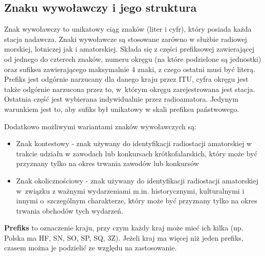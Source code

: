 \documentclass[]{mgr}
\begin{document}
            \subsection{Znaku wywoławczy i jego struktura}
            Znak wywoławczy to unikatowy ciąg znaków (liter i cyfr), który posiada każda stacja nadawcza. Znaki wywoławcze są stosowane zarówno w służbie radiowej morskiej, lotniczej jak i amatorskiej. Składa się z części prefiksowej zawierającej od jednego do czterech znaków, numeru okręgu (na które podzielone są jednostki) oraz sufiksu zawierającego maksymalnie 4 znaki, z czego ostatni musi być literą. Prefiks jest odgórnie narzucany dla danego kraju przez ITU, cyfra okręgu jest także odgórnie narzucona przez to, w~którym okręgu zarejestrowana jest stacja. Ostatnia część jest wybierana indywidualnie przez radioamatora. Jedynym warunkiem jest to, aby sufiks był unikatowy w skali prefiksu państwowego.

            Dodatkowo możliwymi wariantami znaków wywoławczych są:
            \begin{itemize}
                \item Znak kontestowy - znak używany do identyfikacji radiostacji amatorskiej w trakcie udziału w zawodach lub konkursach krótkofalarskich, który może być przyznany tylko na okres trwania zawodów lub konkursów
                \item Znak okolicznościowy - znak używany do identyfikacji radiostacji amatorskiej w~związku z ważnymi wydarzeniami m.in. historycznymi, kulturalnymi i innymi o~szczególnym charakterze, który może być przyznany tylko na okres trwania obchodów tych wydarzeń.
            \end{itemize}

            \textbf{Prefiks} to oznaczenie kraju, przy czym każdy kraj może mieć ich kilka (np. Polska ma HF, SN, SO, SP, SQ, 3Z). Jeżeli kraj ma więcej niż jeden prefiks, czasem można je podzielić ze względu na zastosowanie.
\end{document}
